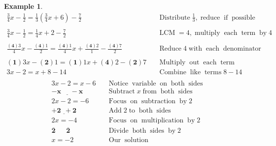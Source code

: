 \documentclass[12pt]{book}
\theoremstyle{definition}
\newtheorem{example}{Example}
\newcommand{\tmmathbf}[1]{\ensuremath{\boldsymbol{#1}}}
\newcommand{\tmop}[1]{\ensuremath{\operatorname{#1}}}
\begin{document}
\begin{example}\label{Lin33}
  \begin{eqnarray*}
    \frac{3}{4} x - \frac{1}{2} = \frac{1}{3} (\frac{3}{4} x + 6) -
    \frac{7}{2} &  & \tmop{Distribute} \frac{1}{3}, \tmop{reduce} \tmop{if}
    \tmop{possible}\\
    &  & \\
    \frac{3}{4} x - \frac{1}{2} = \frac{1}{4} x + 2 - \frac{7}{2} &  &
    \tmop{LCM} = 4, \tmop{multiply} \tmop{each} \tmop{term} \tmop{by} 4\\
    &  & \\
    \frac{\tmmathbf{(4)} 3}{4} x - \frac{\tmmathbf{(4)} 1}{2} =
    \frac{\tmmathbf{(4)} 1}{4} x + \frac{\tmmathbf{(4)} 2}{1} -
    \frac{\tmmathbf{(4)} 7}{2} &  & \tmop{Reduce} 4 \tmop{with} \tmop{each}
    \tmop{denominator}\\
    &  & \\
    \tmmathbf{(1)} 3 x - \tmmathbf{(2)} 1 = \tmmathbf{(1)} 1 x +
    \tmmathbf{(4)} 2 - \tmmathbf{(2)} 7 &  & \tmop{Multiply} \tmop{out}
    \tmop{each} \tmop{term}\\
    3 x - 2 = x + 8 - 14 &  & \tmop{Combine} \tmop{like} \tmop{terms} 8 - 14\\
    \end{eqnarray*}
		\begin{eqnarray*}
		3 x - 2 = x - 6 &  & \tmop{Notice} \tmop{variable} \tmop{on} \tmop{both}
    \tmop{sides}\\
    \tmmathbf{\underline{- x ~~~~~~- x}}~~~~  &  & \tmop{Subtract} x \tmop{from}
    \tmop{both} \tmop{sides}\\
    2 x - 2 = - 6 &  & \tmop{Focus} \tmop{on} \tmop{subtraction} \tmop{by} 2\\
    \tmmathbf{\underline{+ 2 ~~+ 2}} &  & \tmop{Add} 2 \tmop{to} \tmop{both}
    \tmop{sides}\\
    2 x = - 4 &  & \tmop{Focus} \tmop{on} \tmop{multiplication} \tmop{by} 2\\
    \tmmathbf{\overline{2} ~~~~~~~ \overline{2}} &  & \tmop{Divide} \tmop{both}
    \tmop{sides} \tmop{by} 2\\
    x = - 2 &  & \tmop{Our} \tmop{solution}
  \end{eqnarray*}
\end{example}
\end{document}
